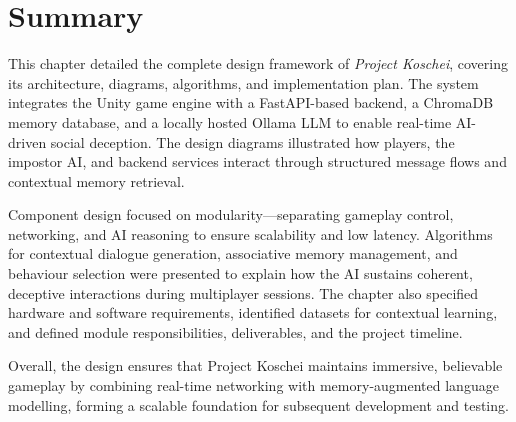 \vspace{30mm}

\section{Summary}

This chapter detailed the complete design framework of \textit{Project Koschei}, covering its architecture, diagrams, algorithms, and implementation plan.
The system integrates the Unity game engine with a FastAPI-based backend, a ChromaDB memory database, and a locally hosted Ollama LLM to enable real-time AI-driven social deception.
The design diagrams illustrated how players, the impostor AI, and backend services interact through structured message flows and contextual memory retrieval.

Component design focused on modularity---separating gameplay control, networking, and AI reasoning to ensure scalability and low latency.
Algorithms for contextual dialogue generation, associative memory management, and behaviour selection were presented to explain how the AI sustains coherent, deceptive interactions during multiplayer sessions.
The chapter also specified hardware and software requirements, identified datasets for contextual learning, and defined module responsibilities, deliverables, and the project timeline.

Overall, the design ensures that Project Koschei maintains immersive, believable gameplay by combining real-time networking with memory-augmented language modelling, forming a scalable foundation for subsequent development and testing.
